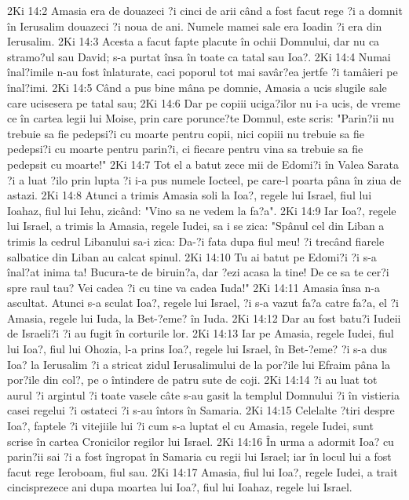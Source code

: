 2Ki 14:2  Amasia era de douazeci ?i cinci de arii când a fost facut rege ?i a domnit în Ierusalim douazeci ?i noua de ani. Numele mamei sale era Ioadin ?i era din Ierusalim.
2Ki 14:3  Acesta a facut fapte placute în ochii Domnului, dar nu ca stramo?ul sau David; s-a purtat însa în toate ca tatal sau Ioa?.
2Ki 14:4  Numai înal?imile n-au fost înlaturate, caci poporul tot mai savâr?ea jertfe ?i tamâieri pe înal?imi.
2Ki 14:5  Când a pus bine mâna pe domnie, Amasia a ucis slugile sale care ucisesera pe tatal sau;
2Ki 14:6  Dar pe copiii uciga?ilor nu i-a ucis, de vreme ce în cartea legii lui Moise, prin care porunce?te Domnul, este scris: "Parin?ii nu trebuie sa fie pedepsi?i cu moarte pentru copii, nici copiii nu trebuie sa fie pedepsi?i cu moarte pentru parin?i, ci fiecare pentru vina sa trebuie sa fie pedepsit cu moarte!"
2Ki 14:7  Tot el a batut zece mii de Edomi?i în Valea Sarata ?i a luat ?ilo prin lupta ?i i-a pus numele Iocteel, pe care-l poarta pâna în ziua de astazi.
2Ki 14:8  Atunci a trimis Amasia soli la Ioa?, regele lui Israel, fiul lui Ioahaz, fiul lui Iehu, zicând: "Vino sa ne vedem la fa?a".
2Ki 14:9  Iar Ioa?, regele lui Israel, a trimis la Amasia, regele Iudei, sa i se zica: "Spânul cel din Liban a trimis la cedrul Libanului sa-i zica: Da-?i fata dupa fiul meu! ?i trecând fiarele salbatice din Liban au calcat spinul.
2Ki 14:10  Tu ai batut pe Edomi?i ?i s-a înal?at inima ta! Bucura-te de biruin?a, dar ?ezi acasa la tine! De ce sa te cer?i spre raul tau? Vei cadea ?i cu tine va cadea Iuda!"
2Ki 14:11  Amasia însa n-a ascultat. Atunci s-a sculat Ioa?, regele lui Israel, ?i s-a vazut fa?a catre fa?a, el ?i Amasia, regele lui Iuda, la Bet-?eme? în Iuda.
2Ki 14:12  Dar au fost batu?i Iudeii de Israeli?i ?i au fugit în corturile lor.
2Ki 14:13  Iar pe Amasia, regele Iudei, fiul lui Ioa?, fiul lui Ohozia, l-a prins Ioa?, regele lui Israel, în Bet-?eme? ?i s-a dus Ioa? la Ierusalim ?i a stricat zidul Ierusalimului de la por?ile lui Efraim pâna la por?ile din col?, pe o întindere de patru sute de coji.
2Ki 14:14  ?i au luat tot aurul ?i argintul ?i toate vasele câte s-au gasit la templul Domnului ?i în vistieria casei regelui ?i ostateci ?i s-au întors în Samaria.
2Ki 14:15  Celelalte ?tiri despre Ioa?, faptele ?i vitejiile lui ?i cum s-a luptat el cu Amasia, regele Iudei, sunt scrise în cartea Cronicilor regilor lui Israel.
2Ki 14:16  În urma a adormit Ioa? cu parin?ii sai ?i a fost îngropat în Samaria cu regii lui Israel; iar în locul lui a fost facut rege Ieroboam, fiul sau.
2Ki 14:17  Amasia, fiul lui Ioa?, regele Iudei, a trait cincisprezece ani dupa moartea lui Ioa?, fiul lui Ioahaz, regele lui Israel.
